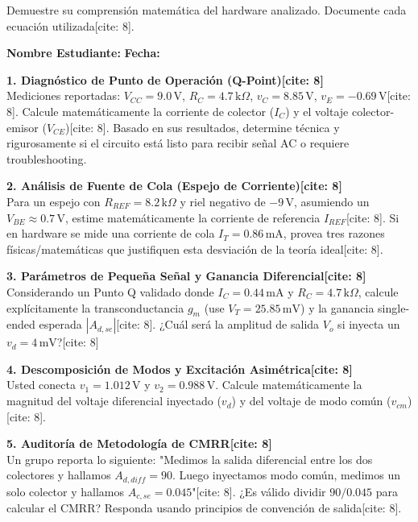\documentclass[11pt, a4paper]{article}
\begin{document}
\begin{tcolorbox}[colback=ucbblue!5, colframe=ucbblue, title=\textbf{Práctica Individual Tipo Examen: Análisis DC y CMRR}]
    Demuestre su comprensión matemática del hardware analizado. Documente cada ecuación utilizada[cite: 8].
\end{tcolorbox}

\textbf{Nombre Estudiante:} \hrulefill \quad \textbf{Fecha:} \hrulefill

\vspace{0.5cm}
\noindent\textbf{1. Diagnóstico de Punto de Operación (Q-Point)[cite: 8]} \\
Mediciones reportadas: $V_{CC}=9.0\,\text{V}$, $R_C=4.7\,\text{k}\Omega$, $v_C=8.85\,\text{V}$, $v_E=-0.69\,\text{V}$[cite: 8].
Calcule matemáticamente la corriente de colector ($I_C$) y el voltaje colector-emisor ($V_{CE}$)[cite: 8]. Basado en sus resultados, determine técnica y rigurosamente si el circuito está listo para recibir señal AC o requiere troubleshooting.
\vspace{3cm}

\noindent\textbf{2. Análisis de Fuente de Cola (Espejo de Corriente)[cite: 8]} \\
Para un espejo con $R_{REF}=8.2\,\text{k}\Omega$ y riel negativo de $-9\,\text{V}$, asumiendo un $V_{BE} \approx 0.7\,\text{V}$, estime matemáticamente la corriente de referencia $I_{REF}$[cite: 8]. 
Si en hardware se mide una corriente de cola $I_T = 0.86\,\text{mA}$, provea tres razones físicas/matemáticas que justifiquen esta desviación de la teoría ideal[cite: 8].
\vspace{3cm}

\noindent\textbf{3. Parámetros de Pequeña Señal y Ganancia Diferencial[cite: 8]} \\
Considerando un Punto Q validado donde $I_C = 0.44\,\text{mA}$ y $R_C = 4.7\,\text{k}\Omega$, calcule explícitamente la transconductancia $g_m$ (use $V_T = 25.85\,\text{mV}$) y la ganancia single-ended esperada $|A_{d,se}|$[cite: 8].
¿Cuál será la amplitud de salida $V_o$ si inyecta un $v_d = 4\,\text{mV}$?[cite: 8]
\vspace{3cm}

\noindent\textbf{4. Descomposición de Modos y Excitación Asimétrica[cite: 8]} \\
Usted conecta $v_1 = 1.012\,\text{V}$ y $v_2 = 0.988\,\text{V}$. Calcule matemáticamente la magnitud del voltaje diferencial inyectado ($v_d$) y del voltaje de modo común ($v_{cm}$)[cite: 8].
\vspace{2.5cm}

\noindent\textbf{5. Auditoría de Metodología de CMRR[cite: 8]} \\
Un grupo reporta lo siguiente: "Medimos la salida diferencial entre los dos colectores y hallamos $A_{d,diff} = 90$. Luego inyectamos modo común, medimos un solo colector y hallamos $A_{c,se} = 0.045$"[cite: 8]. 
¿Es válido dividir $90 / 0.045$ para calcular el CMRR? Responda usando principios de convención de salida[cite: 8].
\vspace{2cm}
\end{document}
